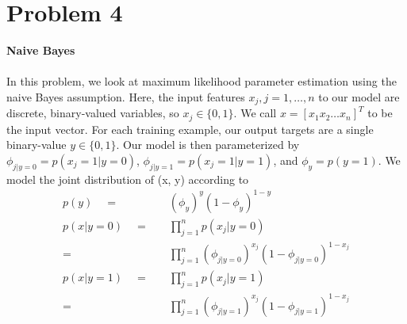 \documentclass{article}
\begin{document}
\section{Problem 4}
\textbf{Naive Bayes\\\\}
In this problem, we look at maximum likelihood parameter estimation using the naive Bayes assumption. Here, the input features $x_j, j = 1,\dots, n$ to our model are discrete, binary-valued variables, so $x_j \in \{0, 1\}.$ We call $x = [x_1 x_2 \dots x_n]^T$ to be the input vector. For each training example, our output targets are a single binary-value $y \in \{0, 1\}$. Our model is then parameterized by $\phi_{j|y=0} = p(x_j = 1|y = 0)$, $\phi_{j|y=1} = p(x_j = 1|y = 1)$, and
$\phi_y = p(y = 1)$. We model the joint distribution of (x, y) according to
\begin{align*}
    p(y) \quad=&{}\quad (\phi_y)^y(1-\phi_y)^{1-y}\\
    p(x|y=0) \quad=&{}\quad \prod_{j=1}^n p(x_j|y=0)\\
    =&{}\quad \prod_{j=1}^n(\phi_{j|y=0})^{x_j}(1-\phi_{j|y=0})^{1-x_j}\\
    p(x|y=1) \quad=&{}\quad \prod_{j=1}^n p(x_j|y=1)\\
    =&{}\quad \prod_{j=1}^n(\phi_{j|y=1})^{x_j}(1-\phi_{j|y=1})^{1-x_j}\\
\end{align*}
\end{document}
